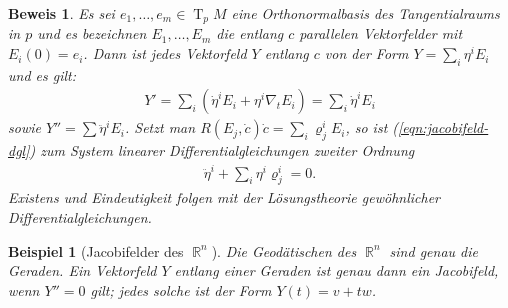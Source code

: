 \documentclass[paper=A4, twoside, chapterprefix=true, bibliography=totoc, headsepline]{scrbook}
\let\temp\phi{}
\let\phi\varphi{}
\let\varphi\temp{}
\let\temp\theta{}
\let\theta\vartheta{}
\let\vartheta\temp{}
\let\temp\epsilon{}
\let\epsilon\varepsilon{}
\let\varepsilon\temp{}
\let\temp\rho{}
\let\rho\varrho{}
\let\varrho\temp{}
\newcommand{\tikzgitter}[3][0.25]{
	\draw[step=#1,gray!15] #2 grid #3;
	\draw[step=2*#1,gray!30] #2 grid #3;
	\fill (0,0) circle(0.1); 
}
\DeclareMathOperator{\R}{\mathbb{R}}
\DeclareMathOperator{\T}{T}         %
\theoremstyle{plain}
\theoremstyle{nonumberplain}
\newtheorem{bsp}{Beispiel}
\newtheorem{bew}{Beweis}
\theoremstyle{empty}
\theoremstyle{break}
\begin{document}
\begin{bew}
  Es sei $e_1, \ldots, e_m \in \T_pM$ eine Orthonormalbasis des Tangentialraums in $p$ und es bezeichnen $E_1, \ldots, E_m$ die entlang $c$ parallelen Vektorfelder mit $E_i(0) = e_i$.
  Dann ist jedes Vektorfeld $Y$ entlang $c$ von der Form $Y = \sum_i \eta^iE_i$ und es gilt:
  \begin{align*}
    Y' = \sum_i (\dot \eta^i E_i + \eta^i\nabla_tE_i) = \sum_i \dot
    \eta^i E_i
  \end{align*}
  sowie $Y'' = \sum \ddot \eta^i E_i$.
  Setzt man $R(E_j,\dot c)\dot c = \sum_i\rho_j^i E_i$, so ist (\ref{eqn:jacobifeld-dgl}) zum System linearer Differentialgleichungen zweiter Ordnung
  \begin{align*}
    \ddot \eta^i + \sum_i \eta^i\rho_j^i = 0.
  \end{align*}
  Existens und Eindeutigkeit folgen mit der L\"osungstheorie gew\"ohnlicher Differentialgleichungen.
\end{bew}

\begin{bsp}[Jacobifelder des $\R^n$]
  Die Geod\"atischen des $\R^n$ sind genau die Geraden.
  Ein Vektorfeld $Y$ entlang einer Geraden ist genau dann ein Jacobifeld, wenn $Y'' = 0$ gilt; jedes solche ist der Form $Y(t) = v + tw$.
  \begin{center}\end{center}
\end{bsp}
\end{document}
